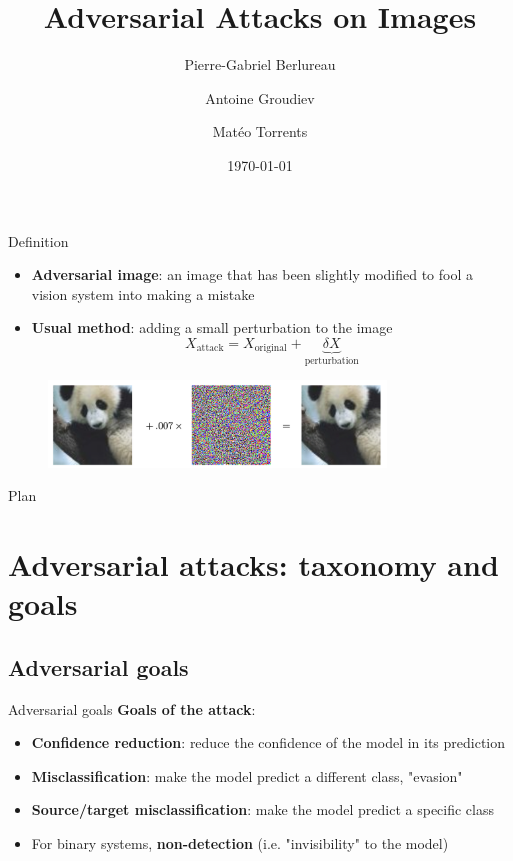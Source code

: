 \documentclass[aspectratio=169]{beamer}
\title{\textbf{Adversarial Attacks on Images}}
\author{Pierre-Gabriel Berlureau\and Antoine Groudiev\and Matéo Torrents}
\date{\today}
\theoremstyle{definition}
\begin{document}
\frame{\titlepage}

\begin{frame}{Definition}
  \begin{itemize}
    \item \textbf{Adversarial image}: an image that has been slightly modified to fool a vision system into making a mistake
    \item \textbf{Usual method}: adding a small perturbation to the image
    \begin{equation*}
      X_{\text{attack}} = X_{\text{original}} + \underbrace{\delta X}_{\text{perturbation}}
    \end{equation*}
  \end{itemize}
  \begin{figure}
    \centering
    \includegraphics[width=0.8\textwidth]{panda.png}
  \end{figure}
\end{frame}

\begin{frame}{Plan}
   \tableofcontents
\end{frame}

\section{Adversarial attacks: taxonomy and goals}
\subsection{Adversarial goals}
\begin{frame}{Adversarial goals}
\textbf{Goals of the attack}:
\begin{itemize}
  \item \textbf{Confidence reduction}: reduce the confidence of the model in its prediction
  \item \textbf{Misclassification}: make the model predict a different class, "evasion"
  \item \textbf{Source/target misclassification}: make the model predict a specific class
  \item For binary systems, \textbf{non-detection} (i.e. "invisibility" to the model)
\end{itemize}
\end{frame}
\end{document}
